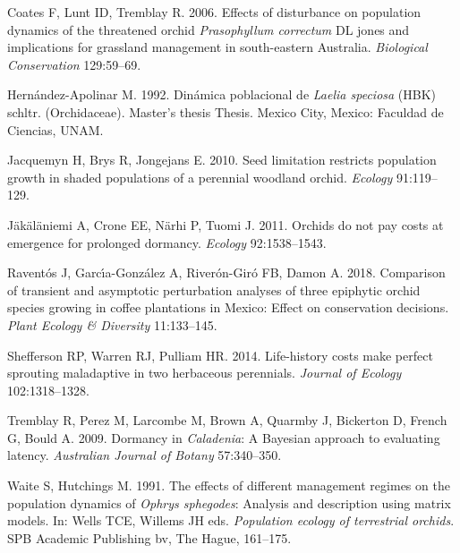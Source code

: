 \documentclass[
  12pt,
  letterpaper,
]{book}
\newlength{\cslhangindent}
\newenvironment{CSLReferences}[2] %
 {\begin{list}{}{%
  \setlength{\itemindent}{0pt}
  \setlength{\leftmargin}{0pt}
  \setlength{\parsep}{0pt}
  \ifodd #1
   \setlength{\leftmargin}{\cslhangindent}
   \setlength{\itemindent}{-1\cslhangindent}
  \fi
  \setlength{\itemsep}{#2\baselineskip}}}
 {\end{list}}
\begin{document}
\label{refs}
\begin{CSLReferences}{1}{0}
Coates F, Lunt ID, Tremblay R. 2006. Effects of disturbance on
population dynamics of the threatened orchid \emph{{P}rasophyllum
{c}orrectum} DL jones and implications for grassland management in
south-eastern {A}ustralia. \emph{Biological Conservation} 129:59--69.

Hernández-Apolinar M. 1992. Din{á}mica poblacional de \emph{{L}aelia
{s}peciosa} (HBK) schltr. ({O}rchidaceae). Master's thesis Thesis.
Mexico City, Mexico: Faculdad de Ciencias, UNAM.

Jacquemyn H, Brys R, Jongejans E. 2010. Seed limitation restricts
population growth in shaded populations of a perennial woodland orchid.
\emph{Ecology} 91:119--129.

Jäkäläniemi A, Crone EE, Närhi P, Tuomi J. 2011. Orchids do not pay
costs at emergence for prolonged dormancy. \emph{Ecology} 92:1538--1543.

Raventós J, Garcı́a-González A, Riverón-Giró FB, Damon A. 2018.
Comparison of transient and asymptotic perturbation analyses of three
epiphytic orchid species growing in coffee plantations in {M}exico:
Effect on conservation decisions. \emph{Plant Ecology \& Diversity}
11:133--145.

Shefferson RP, Warren RJ, Pulliam HR. 2014. Life-history costs make
perfect sprouting maladaptive in two herbaceous perennials.
\emph{Journal of Ecology} 102:1318--1328.

Tremblay R, Perez M, Larcombe M, Brown A, Quarmby J, Bickerton D, French
G, Bould A. 2009. Dormancy in \emph{{C}aladenia}: A {B}ayesian approach
to evaluating latency. \emph{Australian Journal of Botany} 57:340--350.

Waite S, Hutchings M. 1991. The effects of different management regimes
on the population dynamics of \emph{{O}phrys {s}phegodes}: Analysis and
description using matrix models. In: Wells TCE, Willems JH eds.
\emph{Population ecology of terrestrial orchids}. SPB Academic
Publishing bv, The Hague, 161--175.

\end{CSLReferences}


\backmatter
\end{document}
